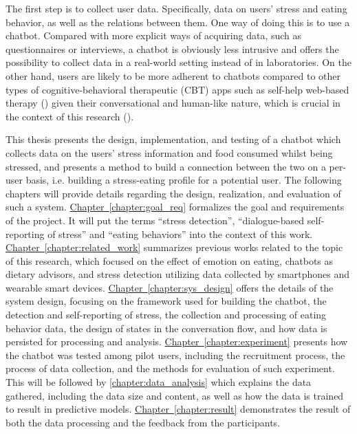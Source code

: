 \noindent The first step is to collect user data. Specifically, data on users’ stress and eating behavior, as well as the relations between them. One way of doing this is to use a chatbot. Compared with more explicit ways of acquiring data, such as questionnaires or interviews, a chatbot is obviously less intrusive and offers the possibility to collect data in a real-world setting instead of in laboratories. On the other hand, users are likely to be more adherent to chatbots compared to other types of cognitive-behavioral therapeutic (CBT) apps such as self-help web-based therapy (\cite{6_cbt}) given their conversational and human-like nature, which is crucial in the context of this research (\cite{3_woebot}).

This thesis presents the design, implementation, and testing of a chatbot which collects data on the users’ stress information and food consumed whilst being stressed, and presents a method to build a connection between the two on a per-user basis, i.e. building a stress-eating profile for a potential user. The following chapters will provide details regarding the design, realization, and evaluation of such a system. \hyperref[chapter:goal_req]{Chapter~\ref*{chapter:goal_req}} formalizes the goal and requirements of the project. It will put the terms “stress detection”, “dialogue-based self-reporting of stress” and “eating behaviors” into the context of this work. \hyperref[chapter:related_work]{Chapter~\ref*{chapter:related_work}} summarizes previous works related to the topic of this research, which focused on the effect of emotion on eating, chatbots as dietary advisors, and stress detection utilizing data collected by smartphones and wearable smart devices. \hyperref[chapter:sys_design]{Chapter~\ref*{chapter:sys_design}} offers the details of the system design, focusing on the framework used for building the chatbot, the detection and self-reporting of stress, the collection and processing of eating behavior data, the design of states in the conversation flow, and how data is persisted for processing and analysis. \hyperref[chapter:experiment]{Chapter~\ref*{chapter:experiment}} presents how the chatbot was tested among pilot users, including the recruitment process, the process of data collection, and the methods for evaluation of such experiment. This will be followed by \autoref{chapter:data_analysis} which explains the data gathered, including the data size and content, as well as how the data is trained to result in predictive models. \hyperref[chapter:result]{Chapter~\ref*{chapter:result}} demonstrates the result of both the data processing and the feedback from the participants.

